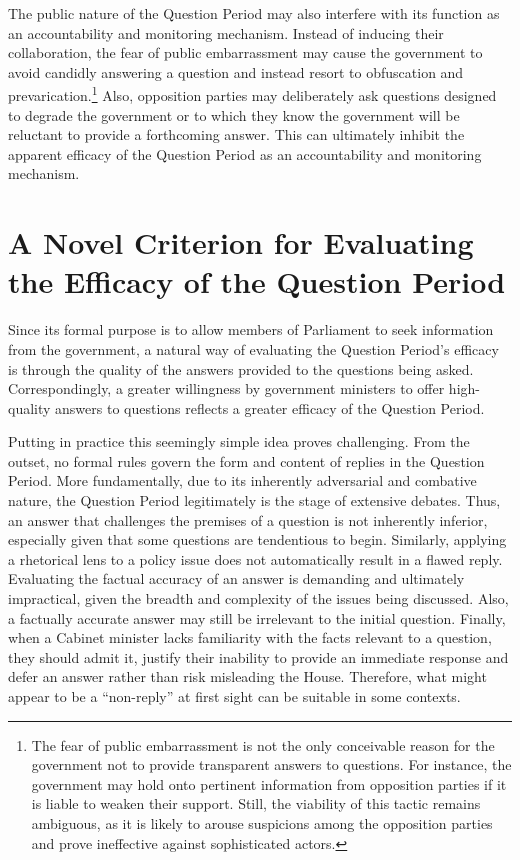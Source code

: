 {{The public nature of the Question Period may also interfere with its function as an accountability and monitoring mechanism. Instead of inducing their collaboration, the fear of public embarrassment may cause the government to avoid candidly answering a question and instead resort to obfuscation and prevarication.\footnote{The fear of public embarrassment is not the only conceivable reason for the government not to provide transparent answers to questions. For instance, the government may hold onto pertinent information from opposition parties if it is liable to weaken their support. Still, the viability of this tactic remains ambiguous, as it is likely to arouse suspicions among the opposition parties and prove ineffective against sophisticated actors.} Also, opposition parties may deliberately ask questions designed to degrade the government or to which they know the government will be reluctant to provide a forthcoming answer. This can ultimately inhibit the apparent efficacy of the Question Period as an accountability and monitoring mechanism.

\section*{A Novel Criterion for Evaluating the Efficacy of the Question Period}

Since its formal purpose is to allow members of Parliament to seek information from the government, a natural way of evaluating the Question Period’s efficacy is through the quality of the answers provided to the questions being asked. Correspondingly, a greater willingness by government ministers to offer high-quality answers to questions reflects a greater efficacy of the Question Period.

Putting in practice this seemingly simple idea proves challenging. From the outset, no formal rules govern the form and content of replies in the Question Period. More fundamentally, due to its inherently adversarial and combative nature, the Question Period legitimately is the stage of extensive debates. Thus, an answer that challenges the premises of a question is not inherently inferior, especially given that some questions are tendentious to begin. Similarly, applying a rhetorical lens to a policy issue does not automatically result in a flawed reply. Evaluating the factual accuracy of an answer is demanding and ultimately impractical, given the breadth and complexity of the issues being discussed. Also, a factually accurate answer may still be irrelevant to the initial question. Finally, when a Cabinet minister lacks familiarity with the facts relevant to a question, they should admit it, justify their inability to provide an immediate response and defer an answer rather than risk misleading the House. Therefore, what might appear to be a ``non-reply'' at first sight can be suitable in some contexts.

}}
